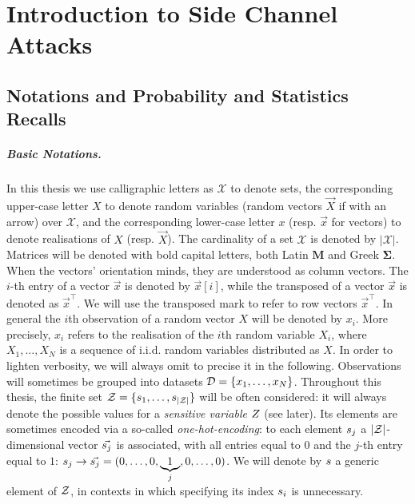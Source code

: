 \chapter{Introduction to Side Channel Attacks} %

\label{ChapterIntroductionSCA}

\section{Notations and Probability and Statistics Recalls}\label{sec:notations}
\paragraph*{Basic Notations.}
In this thesis we use calligraphic letters as $\mathcal{X}$ to denote
sets, the corresponding upper-case letter $X$ to denote random variables (random
vectors $\vec{X}$ if with an arrow) over $\mathcal{X}$, and the corresponding
lower-case letter $x$ (resp. $\vec{x}$ for vectors) to denote realisations of
$X$ (resp. $\vec{X}$). The cardinality of a set $\mathcal{X}$ is denoted by $\lvert\mathcal{X}\rvert$. Matrices will be denoted with bold capital letters, both Latin $\textbf{M}$ and Greek $\boldsymbol{\Sigma}$. When the vectors' orientation minds, they are understood as column vectors. The
$i$-th entry of a vector $\vec{x}$ is denoted by $\vec{x}[i]$, while the transposed of a vector $\vec{x}$ is denoted as $\vec{x}^\intercal$. We will use the transposed mark to refer to row vectors $\vec{x}^\intercal$. In general the $i$th observation of a random vector $X$ will be denoted by $x_i$. More precisely, $x_i$ refers to the realisation of the $i$th random variable $X_i$, where $X_1, \dots , X_N$ is a sequence of i.i.d. random variables distributed as $X$. In order to lighten verbosity, we will always omit to precise it in the following. Observations will sometimes be grouped into datasets $\mathcal{D}=\{x_1,\dots, x_N\}$. Throughout this thesis, the finite set $\mathcal{Z} = \{s_{1}, \dots, s_{\lvert\mathcal{Z}\rvert}\}$ will be often considered: it will always denote the possible values for a \emph{sensitive variable} $Z$ (see later). Its elements are sometimes encoded via a so-called \emph{one-hot-encoding}: to each element $s_{j}$ a $\lvert\mathcal{Z}\rvert$-dimensional vector  $\vec{s_{j}}$ is associated,
with all entries equal to $0$ and the $j$-th entry equal to $1$: $s_{j}
\rightarrow \vec{s_{j}} = (0,\ldots , 0,\underbrace{1}_{j},0,\dots,0)$. We will denote by $s$ a generic element of $\mathcal{Z}$, in contexts in which specifying its index $s_{i}$ is unnecessary.

